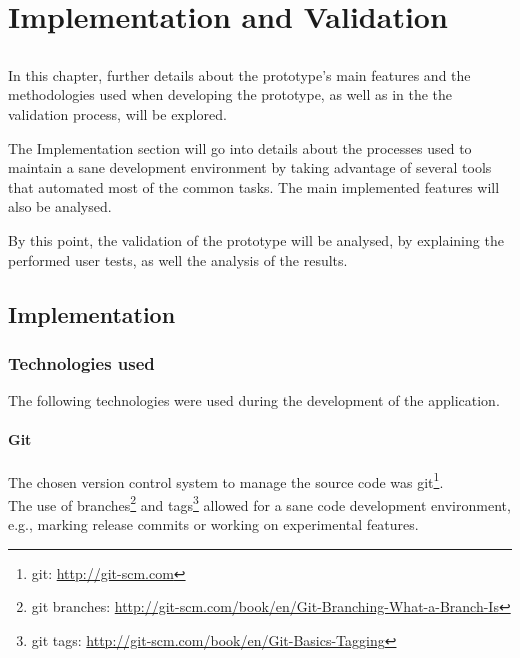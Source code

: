 

\chapter{Implementation and Validation}
\label{chap:chap4}

\section*{}

In this chapter, further details about the prototype's main features and the methodologies used when developing the prototype, as well as in the the validation process, will be explored.

The Implementation section will go into details about the processes used to maintain a sane development environment by taking advantage of several tools that automated most of the common tasks. The main implemented features will also be analysed.

By this point, the validation of the prototype will be analysed, by explaining the performed user tests, as well the analysis of the results.

\section{Implementation} %
\label{sec:implementation}

    
  \subsection{Technologies used} %
  \label{sub:technologies}

    The following technologies were used during the development of the application.

    \subsubsection{Git} %
    \label{ssub:git}
    
    The chosen version control system to manage the source code was git\footnote{git: \url{http://git-scm.com}}. \\
    The use of branches\footnote{git branches: \url{http://git-scm.com/book/en/Git-Branching-What-a-Branch-Is}} and tags\footnote{git tags: \url{http://git-scm.com/book/en/Git-Basics-Tagging}} allowed for a sane code development environment, e.g., marking release commits or working on experimental features.

